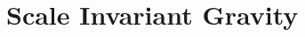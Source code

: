 \documentclass[aps,prd,reprint,preprintnumbers,showpacs,floatfix,nofootinbib,superscript address]{revtex4-2}
\begin{document}
\section{Scale Invariant Gravity} \label{Scale Invariant Gravity}

\end{document}
